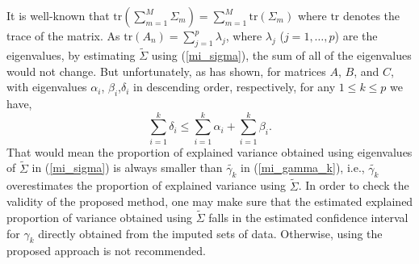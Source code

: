 \documentclass[11pt,a5paper,twoside]{book}
\begin{document}
It is well-known \citep{Harville1997} that $\mathrm{tr}(\sum_{m=1}^M \Sigma_m) = \sum_{m=1}^M \mathrm{tr}(\Sigma_m)$ where $\mathrm{tr}$ denotes the trace of the matrix. As $\mathrm{tr}(A_n)=\sum_{j=1}^p \lambda_j$, where $\lambda_j$ ($j=1,\ldots,p $) are the eigenvalues, by estimating $\widetilde{\Sigma}$ using (\ref{mi_sigma}), the sum of all of the eigenvalues would not change. But unfortunately, as \cite{fan1949} has shown, for matrices $A$, $B$, and $C$, with eigenvalues $\alpha_i$, $\beta_i$,$\delta_i$ in descending order, respectively, for any $1\leq k\leq p$ we have,
\begin{equation}
\label{KyFan}
\sum_{i=1}^k \delta_i \leq \sum_{i=1}^k \alpha_i + \sum_{i=1}^k \beta_i.
\end{equation}
That would mean the proportion of explained variance obtained using eigenvalues of $\widetilde{\Sigma}$ in (\ref{mi_sigma}) is always smaller than $\widetilde{\gamma_k}$ in (\ref{mi_gamma_k}), i.e., $\widetilde{\gamma_k}$ overestimates the proportion of explained variance using $\widetilde{\Sigma}$. In order to check the validity of the proposed method, one may make sure that the estimated explained proportion of variance obtained using $\widetilde{\Sigma}$ falls in the estimated confidence interval for $\gamma_k$ directly obtained from the imputed sets of data. Otherwise, using the proposed approach is not recommended.
\end{document}
